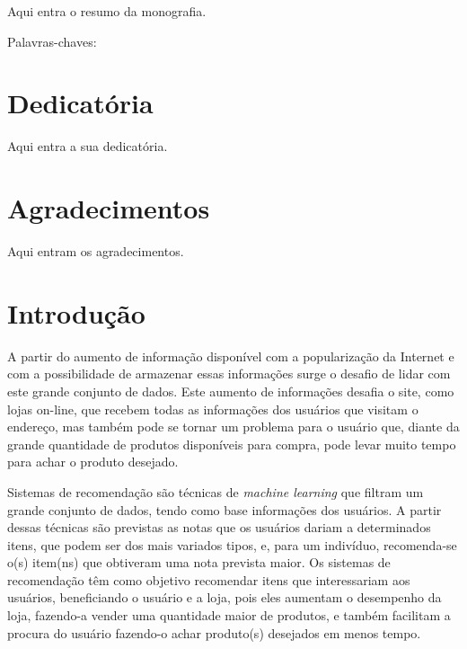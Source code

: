 \documentclass[12pt,a4paper,header]{abnt}
\begin{document}
\begin{resumo}
Aqui entra o resumo da monografia.

\vspace{1cm}
\noindent Palavras-chaves: 


\end{resumo}



\chapter*{Dedicatória}
Aqui entra a sua dedicatória. 



\chapter*{Agradecimentos}
Aqui entram os agradecimentos. 



\tableofcontents{}
\listoffigures
\listoftables



\chapter{Introdução} \label{cap:introducao}

A partir do aumento de informação disponível com a popularização da Internet e com a possibilidade de armazenar essas informações surge o desafio de lidar com este grande conjunto de dados\cite{isinkaye2015recommendation}. Este aumento de informações desafia o site, como lojas on-line, que recebem todas as informações dos usuários que visitam o endereço, mas também pode se tornar um problema para o usuário que, diante da grande quantidade de produtos disponíveis para compra, pode levar muito tempo para achar o produto desejado\cite{mild2002collaborative}.

Sistemas de recomendação são técnicas de \textit{machine learning} que filtram um grande conjunto de dados, tendo como base informações dos usuários\cite{takahashi2015estudo}. A partir dessas técnicas são previstas as notas que os usuários dariam a determinados itens, que podem ser dos mais variados tipos, e, para um indivíduo, recomenda-se o(s) item(ns) que obtiveram uma nota prevista maior\cite{shapira2011recommender}. Os sistemas de recomendação têm como objetivo recomendar itens que interessariam aos usuários\cite{melville2011recommender}, beneficiando o usuário e a loja, pois eles aumentam o desempenho da loja, fazendo-a vender uma quantidade maior de produtos, e também facilitam a procura do usuário fazendo-o achar produto(s) desejados em menos tempo\cite{isinkaye2015recommendation}. 
\end{document}
